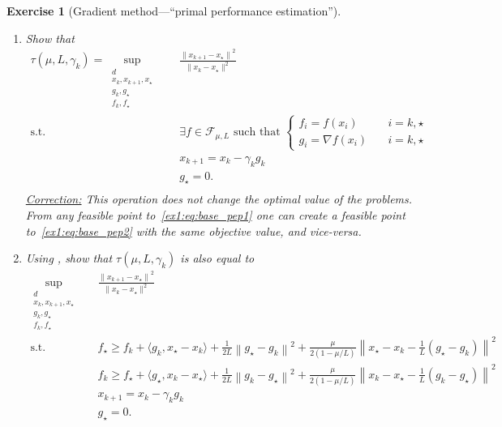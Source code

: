 \documentclass[11pt,a4paper]{article}
\newcommand{\normsq}[1]{{\left\lVert#1\right\rVert}^2}
\newcommand{\inner}[2]{{\langle #1, #2\rangle}}
\DeclareMathOperator*{\argmin}{argmin}
\newcommand{\correction}[1]{{{\color{blue}\underline{Correction:} #1}}}
\newcommand{\correction}[1]{}
\newtheorem{exercise}{Exercise}
\begin{document}
\begin{exercise}[Gradient method---``primal performance estimation'']
\begin{enumerate}
	\correction{We trivially have~\eqref{ex1:eq:distance} $\Leftrightarrow \frac{\|x_{k+1}-x_\star\|^2}{\|x_k-x_\star\|^2}\leqslant \tau(\mu,L,\gamma_k)$ for any $d\in\mathbb{N}$, for any $f\in\mathcal{F}_{\mu,L}$, and for all $x_k,x_{k+1}\in\mathbb{R}^d$ such that $x_{k+1}=x_k-\gamma_k \nabla f(x_k)$, and $x_\star\in\argmin_x f(x)$ (with $x_\star\neq x_k$). It trivially follows that $\tau(\mu,L,\gamma_k)$ upper bounds the RHS of~\eqref{ex1:eq:base_pep1}.
	By definition of~\eqref{ex1:eq:distance}, this is even the smallest one, hence the equality.
	}
	\item Show that
	\begin{equation}\label{ex1:eq:base_pep2}
		\begin{aligned}
		\tau(\mu,L,\gamma_k)=\sup_{\substack{d\\x_k,x_{k+1},x_\star\\g_k,g_\star\\f_k,f_\star}} \quad & \frac{{\|x_{k+1}-x_\star\|}^2}{\|x_k-x_\star\|^2}\\
		\text{s.t. } & \exists f\in\mathcal{F}_{\mu,L} \text{ such that }\left\{\begin{array}{ll}
			f_i=f(x_i)\quad & i=k,\star\\
			g_i=\nabla f(x_i)\quad & i=k,\star
			\end{array}\right.\\
		& x_{k+1}=x_k-\gamma_k  g_k\\
		& g_\star=0.\\
		\end{aligned}
		\end{equation}
	\correction{This operation does not change the optimal value of the problems. From any feasible point to~\eqref{ex1:eq:base_pep1} one can create a feasible point to~\eqref{ex1:eq:base_pep2} with the same objective value, and vice-versa.}
	
	\item Using , show that $\tau(\mu,L,\gamma_k)$ is also equal to
	\begin{equation}\label{ex1:eq:base_pep3}
		\begin{aligned}
		\sup_{\substack{d\\x_k,x_{k+1},x_\star\\g_k,g_\star\\f_k,f_\star}} \quad & \frac{{\|x_{k+1}-x_\star\|}^2}{\|x_k-x_\star\|^2}\\
		\text{s.t. } & f_\star\geqslant f_k+\inner{g_k}{x_\star-x_k}+\tfrac{1}{2L}\normsq{g_\star-g_k}+\tfrac{\mu}{2(1-\mu/L)}\normsq{x_\star-x_k-\tfrac{1}{L}(g_\star-g_k)}\\
			&f_k\geqslant f_\star+\inner{g_\star}{x_k-x_\star}+\tfrac{1}{2L}\normsq{g_k-g_\star}+\tfrac{\mu}{2(1-\mu/L)}\normsq{x_k-x_\star-\tfrac{1}{L}(g_k-g_\star)}\\
		& x_{k+1}=x_k-\gamma_k  g_k\\
		& g_\star=0.\\
		\end{aligned}
		\end{equation}
		

\end{enumerate}
\end{exercise}
\end{document}
